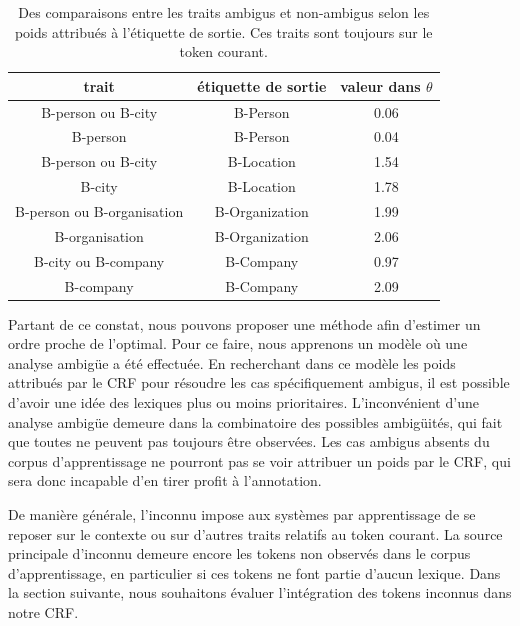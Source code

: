 \documentclass[12pt,a4paper,times,twoside,openright]{report}
\begin{document}
\begin{table}
\centering
\begin{tabular}{|c|c|c|}
\hline
trait & étiquette de sortie & valeur dans $\theta$\\
\hline
B-person ou B-city & B-Person & 0.06\\
B-person & B-Person & 0.04\\
\hline
B-person ou B-city & B-Location & 1.54\\
B-city & B-Location & 1.78\\
\hline
B-person ou B-organisation & B-Organization & 1.99\\
B-organisation & B-Organization & 2.06\\
\hline
B-city ou B-company & B-Company & 0.97\\
B-company & B-Company & 2.09\\
\hline
\end{tabular}
\caption{Des comparaisons entre les traits ambigus et non-ambigus selon les poids attribués à l'étiquette de sortie. Ces traits sont toujours sur le token courant.}
\label{tab:priorities-examples}
\end{table}

Partant de ce constat, nous pouvons proposer une méthode afin d'estimer un ordre proche de l'optimal. Pour ce faire, nous apprenons un modèle où une analyse ambigüe a été effectuée. En recherchant dans ce modèle les poids attribués par le CRF pour résoudre les cas spécifiquement ambigus, il est possible d'avoir une idée des lexiques plus ou moins prioritaires. L'inconvénient d'une analyse ambigüe demeure dans la combinatoire des possibles ambigüités, qui fait que toutes ne peuvent pas toujours être observées. Les cas ambigus absents du corpus d'apprentissage ne pourront pas se voir attribuer un poids par le CRF, qui sera donc incapable d'en tirer profit à l'annotation.

De manière générale, l'inconnu impose aux systèmes par apprentissage de se reposer sur le contexte ou sur d'autres traits relatifs au token courant. La source principale d'inconnu demeure encore les tokens non observés dans le corpus d'apprentissage, en particulier si ces tokens ne font partie d'aucun lexique. Dans la section suivante, nous souhaitons évaluer l'intégration des tokens inconnus dans notre CRF.
\end{document}
